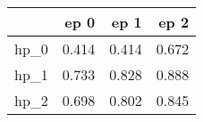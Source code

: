 \begin{tabular}{lrrr}
\toprule
{} &   ep 0 &   ep 1 &   ep 2 \\
\midrule
hp\_0 &  0.414 &  0.414 &  0.672 \\
hp\_1 &  0.733 &  0.828 &  0.888 \\
hp\_2 &  0.698 &  0.802 &  0.845 \\
\bottomrule
\end{tabular}

